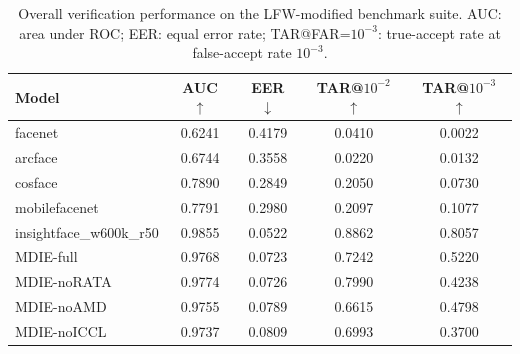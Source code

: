 \begin{table}[t]
\centering
\caption{Overall verification performance on the LFW-modified benchmark suite. AUC: area under ROC; EER: equal error rate; TAR@FAR=$10^{-3}$: true-accept rate at false-accept rate $10^{-3}$.}
\label{tab:overall}
\begin{tabular}{lcccc}
\hline
Model & AUC $\uparrow$ & EER $\downarrow$ & TAR@$10^{-2}$ $\uparrow$ & TAR@$10^{-3}$ $\uparrow$ \\
\hline
facenet & 0.6241 & 0.4179 & 0.0410 & 0.0022 \\
arcface & 0.6744 & 0.3558 & 0.0220 & 0.0132 \\
cosface & 0.7890 & 0.2849 & 0.2050 & 0.0730 \\
mobilefacenet & 0.7791 & 0.2980 & 0.2097 & 0.1077 \\
insightface_w600k_r50 & 0.9855 & 0.0522 & 0.8862 & 0.8057 \\
MDIE-full & 0.9768 & 0.0723 & 0.7242 & 0.5220 \\
MDIE-noRATA & 0.9774 & 0.0726 & 0.7990 & 0.4238 \\
MDIE-noAMD & 0.9755 & 0.0789 & 0.6615 & 0.4798 \\
MDIE-noICCL & 0.9737 & 0.0809 & 0.6993 & 0.3700 \\
\hline
\end{tabular}
\end{table}

